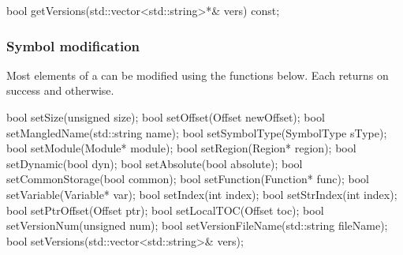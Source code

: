 \begin{apient}
bool getVersions(std::vector<std::string>*& vers) const;
\end{apient}

\subsubsection{Symbol modification}

Most elements of a  can be modified using the functions below. Each returns  on success and  otherwise.

\begin{apient}
bool setSize(unsigned size);
bool setOffset(Offset newOffset);
bool setMangledName(std::string name);
bool setSymbolType(SymbolType sType);
bool setModule(Module* module);
bool setRegion(Region* region);
bool setDynamic(bool dyn);
bool setAbsolute(bool absolute);
bool setCommonStorage(bool common);
bool setFunction(Function* func);
bool setVariable(Variable* var);
bool setIndex(int index);
bool setStrIndex(int index);
bool setPtrOffset(Offset ptr);
bool setLocalTOC(Offset toc);
bool setVersionNum(unsigned num);
bool setVersionFileName(std::string fileName);
bool setVersions(std::vector<std::string>& vers);
\end{apient}

